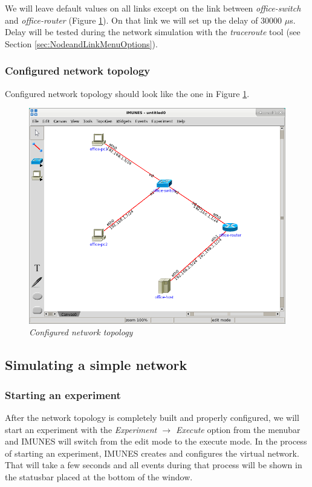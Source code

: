 We will leave default values on all links except on the link between
\emph{office-switch} and \emph{office-router} (Figure
\ref{fig:configured_topology}). On that link we will set up the delay of 30000
$\mu$s. Delay will be tested during the network simulation with the
\emph{traceroute} tool (see Section \ref{sec:NodeandLinkMenuOptions}).

\subsubsection{Configured network topology}
Configured network topology should look like the one in Figure
\ref{fig:configured_topology}.

\begin{figure}[H]
\centering
\vspace{10pt}
\includegraphics[width=\textwidth]{./images/simple_topology_configured.png}
\caption{\emph{Configured network topology}}
\label{fig:configured_topology}
\end{figure}

\subsection{Simulating a simple network}
\label{sec:simulating a simple network}

\subsubsection{Starting an experiment}
After the network topology is completely built and properly configured, we will
start an experiment with the \emph{Experiment $\to$ Execute}  option from the
menubar and IMUNES will switch from the edit mode to the execute mode. In the
process of starting an experiment, IMUNES creates and configures the virtual
network. That will take a few seconds and all events during that process will
be shown in the statusbar placed at the bottom of the window.

